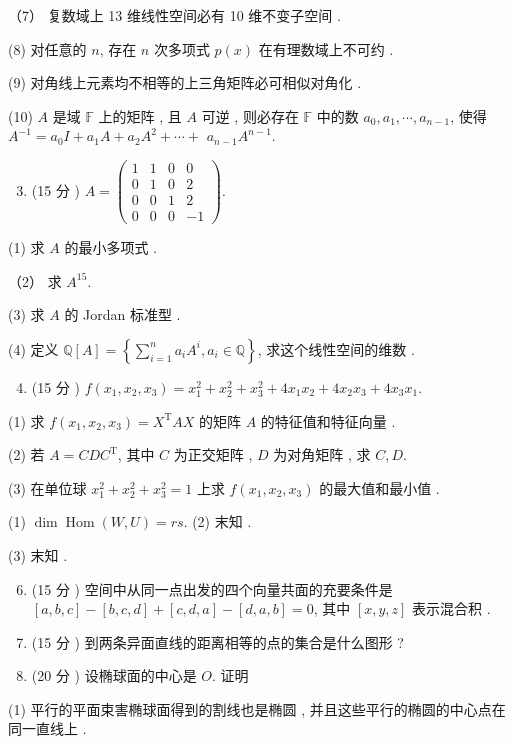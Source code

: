 \documentclass[10pt]{article}
\begin{document}
（7） 复数域上  13  维线性空间必有  10  维不变子空间 .

(8)  对任意的  $n$,  存在  $n$  次多项式  $p(x)$  在有理数域上不可约 .

(9)  对角线上元素均不相等的上三角矩阵必可相似对角化 .

(10) $A$  是域  $\mathbb{F}$  上的矩阵 ,  且  $A$  可逆 ,  则必存在  $\mathbb{F}$  中的数  $a_{0}, a_{1}, \cdots, a_{n-1}$,  使得  $A^{-1}=a_{0} I+a_{1} A+a_{2} A^{2}+\cdots+$ $a_{n-1} A^{n-1}$.

\begin{enumerate}
  \setcounter{enumi}{2}
  \item (15  分 ) $A=\left(\begin{array}{cccc}1 & 1 & 0 & 0 \\ 0 & 1 & 0 & 2 \\ 0 & 0 & 1 & 2 \\ 0 & 0 & 0 & -1\end{array}\right)$.
\end{enumerate}
(1)  求  $A$  的最小多项式 .

（2） 求  $A^{15}$.

(3)  求  $A$  的  Jordan  标准型 .

(4)  定义  $\mathbb{Q}[A]=\left\{\sum_{i=1}^{n} a_{i} A^{i}, a_{i} \in \mathbb{Q}\right\}$,  求这个线性空间的维数 .

\begin{enumerate}
  \setcounter{enumi}{3}
  \item (15  分 ) $f\left(x_{1}, x_{2}, x_{3}\right)=x_{1}^{2}+x_{2}^{2}+x_{3}^{2}+4 x_{1} x_{2}+4 x_{2} x_{3}+4 x_{3} x_{1}$.
\end{enumerate}
(1)  求  $f\left(x_{1}, x_{2}, x_{3}\right)=X^{\mathrm{T}} A X$  的矩阵  $A$  的特征值和特征向量 .

(2)  若  $A=C D C^{\mathrm{T}}$,  其中  $C$  为正交矩阵 , $D$  为对角矩阵 ,  求  $C, D$.

(3)  在单位球  $x_{1}^{2}+x_{2}^{2}+x_{3}^{2}=1$  上求  $f\left(x_{1}, x_{2}, x_{3}\right)$  的最大值和最小值 .

(1) $\operatorname{dim} \operatorname{Hom}(W, U)=r s$. (2)  末知 .

(3)  末知 .

\begin{enumerate}
  \setcounter{enumi}{5}
  \item (15  分 )  空间中从同一点出发的四个向量共面的充要条件是  $[a, b, c]-[b, c, d]+[c, d, a]-[d, a, b]=0$,  其中  $[x, y, z]$  表示混合积 .

  \item (15  分 )  到两条异面直线的距离相等的点的集合是什么图形 ?

  \item (20  分 )  设椭球面的中心是  $O$.  证明 

\end{enumerate}
(1)  平行的平面束害椭球面得到的割线也是椭圆 ,  并且这些平行的椭圆的中心点在同一直线上 .
\end{document}
